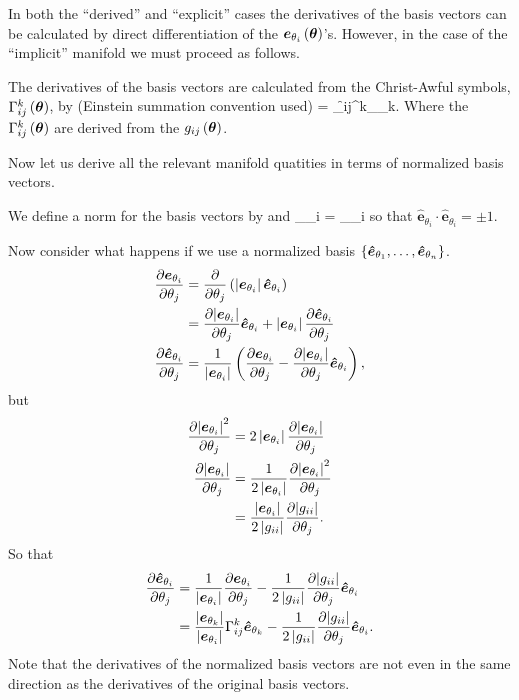 \documentclass[12pt]{book}
\newcommand{\ebh}{\bm{\hat{e}}}
\begin{document}
In both the ``derived'' and ``explicit'' cases the derivatives of the basis vectors can be calculated by 
direct differentiation of the ${\bm{e}_{\theta_{i}}}\left ( {\bm{\theta}} \right )$'s. However, in the case of the ``implicit'' manifold
we must proceed as follows.

The derivatives of the basis vectors are calculated from the Christ-Awful symbols, ${\Gamma_{ij}^{k}}\left ( {\bm{\theta}} \right )$,
by (Einstein summation convention used)
\be
	 = \f{\Gamma_{ij}^{k}}{\bm{\theta}}\eb_{\theta_{k}}.
\ee
Where the ${\Gamma_{ij}^{k}}\left ( {\bm{\theta}} \right )$ are derived from the ${g_{ij}}\left ( {\bm{\theta}} \right )$.

Now let us derive all the relevant manifold quatities in terms of normalized basis vectors.

We define a norm for the basis vectors by
\be
	 \equiv {}
\ee
and
\be
	\eb_{\theta_{i}} = \ebh_{\theta_{i}}
\ee
so that $\ebh_{\theta_{i}}\cdot\ebh_{\theta_{i}} = \pm 1$.

Now consider what happens if we use a normalized basis $\set{\ebh_{\theta_{1}},\dots,\ebh_{\theta_{n}}}$.
\begin{align}
	\pdiff{\eb_{\theta_{i}}}{\theta_{j}} &= 
		\pdiff{}{\theta_{j}}\paren{\abs{\eb_{\theta_{i}}}\ebh_{\theta_{i}}} \nonumber \\
		& = \pdiff{\abs{\eb_{\theta_{i}}}}{\theta_{j}}\ebh_{\theta_{i}}
		    +\abs{\eb_{\theta_{i}}}\pdiff{\ebh_{\theta_{i}}}{\theta_{j}} \nonumber \\
	\pdiff{\ebh_{\theta_{i}}}{\theta_{j}} &=
			\bfrac{1}{\abs{\eb_{\theta_{i}}}}\paren{\pdiff{\eb_{\theta_{i}}}{\theta_{j}}
			- \pdiff{\abs{\eb_{\theta_{i}}}}{\theta_{j}}\ebh_{\theta_{i}}},
\end{align}
but
\begin{align}
	\displaystyle\frac{\partial{\left | {\bm{e}_{\theta_{i}}} \right |^{2}}}{\partial{\theta_{j}}} &= 
		2\left | {\bm{e}_{\theta_{i}}} \right |\displaystyle\frac{\partial{\left | {\bm{e}_{\theta_{i}}} \right |}}{\partial{\theta_{j}}} \nonumber \\
	\displaystyle\frac{\partial{\left | {\bm{e}_{\theta_{i}}} \right |}}{\partial{\theta_{j}}} &= \displaystyle\frac{1}{2\left | {\bm{e}_{\theta_{i}}} \right |}
	                                              \displaystyle\frac{\partial{\left | {\bm{e}_{\theta_{i}}} \right |^{2}}}{\partial{\theta_{j}}} \nonumber \\
	                                           &= \displaystyle\frac{\left | {\bm{e}_{\theta_{i}}} \right |}{2\left | {g_{ii}} \right |}
	                                              \displaystyle\frac{\partial{\left | {g_{ii}} \right |}}{\partial{\theta_{j}}}.
\end{align}
So that
\begin{align}
	\pdiff{\ebh_{\theta_{i}}}{\theta_{j}} &= 
		\bfrac{1}{\abs{\eb_{\theta_{i}}}}\pdiff{\eb_{\theta_{i}}}{\theta_{j}}
		- \bfrac{1}{2\abs{g_{ii}}}\pdiff{\abs{g_{ii}}}{\theta_{j}}\ebh_{\theta_{i}} \nonumber \\
	    &= \bfrac{\abs{\eb_{\theta_{k}}}}{\abs{\eb_{\theta_{i}}}}\Gamma_{ij}^{k}\ebh_{\theta_{k}}
	      - \bfrac{1}{2\abs{g_{ii}}}\pdiff{\abs{g_{ii}}}{\theta_{j}}\ebh_{\theta_{i}}.
\end{align}
Note that the derivatives of the normalized basis vectors are not even in the same direction as the derivatives
of the original basis vectors.
\end{document}
